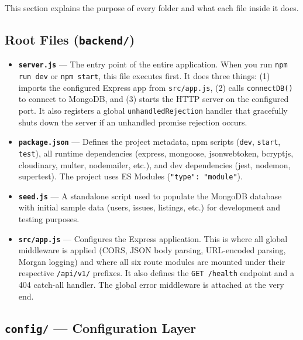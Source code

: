 \documentclass[12pt,a4paper]{article}
\begin{document}
This section explains the purpose of every folder and what each file inside it does.

\subsection{Root Files (\texttt{backend/})}

\begin{itemize}[leftmargin=1cm]
  \item \textbf{\texttt{server.js}} --- The entry point of the entire application. When you run \texttt{npm run dev} or \texttt{npm start}, this file executes first. It does three things: (1) imports the configured Express app from \texttt{src/app.js}, (2) calls \texttt{connectDB()} to connect to MongoDB, and (3) starts the HTTP server on the configured port. It also registers a global \texttt{unhandledRejection} handler that gracefully shuts down the server if an unhandled promise rejection occurs.

  \item \textbf{\texttt{package.json}} --- Defines the project metadata, npm scripts (\texttt{dev}, \texttt{start}, \texttt{test}), all runtime dependencies (express, mongoose, jsonwebtoken, bcryptjs, cloudinary, multer, nodemailer, etc.), and dev dependencies (jest, nodemon, supertest). The project uses ES Modules (\texttt{"type": "module"}).

  \item \textbf{\texttt{seed.js}} --- A standalone script used to populate the MongoDB database with initial sample data (users, issues, listings, etc.) for development and testing purposes.

  \item \textbf{\texttt{src/app.js}} --- Configures the Express application. This is where all global middleware is applied (CORS, JSON body parsing, URL-encoded parsing, Morgan logging) and where all six route modules are mounted under their respective \texttt{/api/v1/} prefixes. It also defines the \texttt{GET /health} endpoint and a 404 catch-all handler. The global error middleware is attached at the very end.
\end{itemize}

\subsection{\texttt{config/} --- Configuration Layer}
\end{document}
